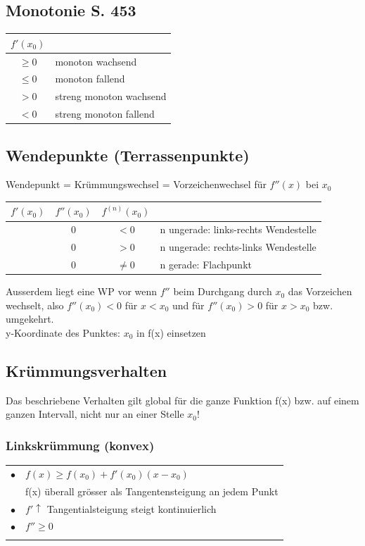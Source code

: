			\subsection{Monotonie S. 453}
			\begin{tabular}{| c | l |}
			\hline
			$f'(x_0)$ &  \\
			\hline
			$ \geq 0$  & monoton wachsend \\
			\hline
			$ \leq 0$ & monoton fallend \\
			\hline
			$ > 0$  &  streng monoton wachsend \\
			\hline
			$ < 0$  &  streng monoton fallend \\
			\hline
			\end{tabular}
			
			
			\subsection{Wendepunkte (Terrassenpunkte)}
			Wendepunkt = Krümmungswechsel = Vorzeichenwechsel für $f''(x)$ bei $x_0$ \\
			
			\begin{tabular}{| c | c | c | l |}
			\hline
			$f'(x_0)$ & $f''(x_0)$ & $f^{(n)}(x_0)$ & \\
			\hline
			 & 0 & $ < 0$ & n ungerade: links-rechts Wendestelle \\
			\hline
			 & 0 & $ > 0$ & n ungerade: rechts-links Wendestelle \\
			\hline
			 & 0 & $\neq 0$ & n gerade: Flachpunkt \\
			\hline
			\end{tabular}
			
			Ausserdem liegt eine WP vor wenn $f''$ beim Durchgang durch $x_0$ das Vorzeichen wechselt, also $f''(x_0) < 0$ für $x < x_0$ und für $f''(x_0) > 0$ für $x > x_0$ bzw. umgekehrt.\\
			
			y-Koordinate des Punktes: $x_0$ in f(x) einsetzen		
			
			\columnbreak


			\subsection{Krümmungsverhalten} 
			Das beschriebene Verhalten gilt global für die ganze Funktion f(x) bzw. auf einem ganzen Intervall, nicht nur an einer Stelle $x_0$!
			
			\subsubsection{Linkskrümmung (konvex)}
			\begin{tabular}{ll}
			$\bullet$ & $f(x) \geq f(x_0) + f'(x_0)(x-x_0)$ \\
			& f(x) überall grösser als Tangentensteigung an jedem Punkt \\
			$\bullet$ & $f' \uparrow$ Tangentialsteigung steigt kontinuierlich \\
			$\bullet$ & $f'' \geq 0$ \\
			\\
			\end{tabular}
			
